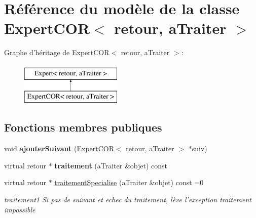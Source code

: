 \hypertarget{class_expert_c_o_r}{\section{Référence du modèle de la classe Expert\+C\+O\+R$<$ retour, a\+Traiter $>$}
\label{class_expert_c_o_r}
}
Graphe d'héritage de Expert\+C\+O\+R$<$ retour, a\+Traiter $>$\+:\begin{figure}[H]
\begin{center}
\leavevmode
\includegraphics[height=2.000000cm]{class_expert_c_o_r}
\end{center}
\end{figure}
\subsection*{Fonctions membres publiques}
\begin{DoxyCompactItemize}
\item 
\hypertarget{class_expert_c_o_r_aac1c145afdd4e0ae81fd484c05ea9e64}{void {\bfseries ajouter\+Suivant} (\hyperlink{class_expert_c_o_r}{Expert\+C\+O\+R}$<$ retour, a\+Traiter $>$ $\ast$suiv)}\label{class_expert_c_o_r_aac1c145afdd4e0ae81fd484c05ea9e64}

\item 
\hypertarget{class_expert_c_o_r_aca5940c9d0b1fe6ce0f2318636a19ac5}{virtual retour $\ast$ {\bfseries traitement} (a\+Traiter \&objet) const }\label{class_expert_c_o_r_aca5940c9d0b1fe6ce0f2318636a19ac5}

\item 
virtual retour $\ast$ \hyperlink{class_expert_c_o_r_a7574fdd9c8321c8d7e4be820740d0760}{traitement\+Specialise} (a\+Traiter \&objet) const =0
\begin{DoxyCompactList}\small\item\em traitement1 Si pas de suivant et echec du traitement, lève l'exception traitement impossible \end{DoxyCompactList}\end{DoxyCompactItemize}


